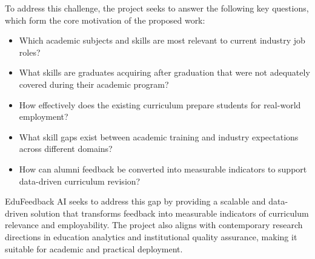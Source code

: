 To address this challenge, the project seeks to answer the following key questions, which form the core motivation of the proposed work:
\begin{itemize}
    \item Which academic subjects and skills are most relevant to current industry job roles?
    \item What skills are graduates acquiring after graduation that were not adequately covered during their academic program?
    \item How effectively does the existing curriculum prepare students for real-world employment?
    \item What skill gaps exist between academic training and industry expectations across different domains?
    \item How can alumni feedback be converted into measurable indicators to support data-driven curriculum revision?
\end{itemize}

EduFeedback AI seeks to address this gap by providing a scalable and data-driven solution that transforms feedback into measurable indicators of curriculum relevance and employability. The project also aligns with contemporary research directions in education analytics and institutional quality assurance, making it suitable for academic and practical deployment.
